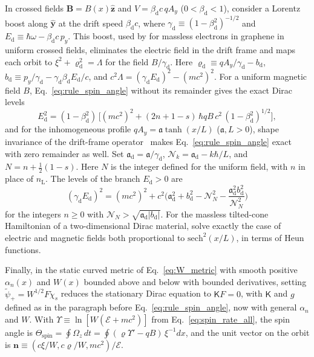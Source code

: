 \documentclass[aps,prd,onecolumn,tightenlines,nofootinbib,notitlepage,11pt,floatfix]{revtex4-2}
\theoremstyle{indentedtheorem}
\begin{document}
In crossed fields $\mathbf{B}=B(x)\hat{\mathbf{z}}$ and $V=\beta_\text{d}c\,qA_y$ ($0<\beta_\text{d}<1$), consider a Lorentz boost along $\hat{\mathbf{y}}$ at the drift speed $\beta_\text{d}c$, where $\gamma_\text{d} \equiv (1-\beta_\text{d}^2)^{-1/2}$ and $E_\text{d} \equiv \hbar\omega - \beta_\text{d}c\,p_y$. This boost, used by \citet{Lukose2007Novel} for massless electrons in graphene in uniform crossed fields, eliminates the electric field in the drift frame and maps each orbit to $\xi^2+\varrho_\text{d}^2=\Lambda$ for the field $B/\gamma_\text{d}$. Here $\varrho_\text{d} \equiv qA_y/\gamma_\text{d}-b_\text{d}$, $b_\text{d} \equiv p_y/\gamma_\text{d} - \gamma_\text{d}\beta_\text{d}E_\text{d}/c$, and $c^2\Lambda = (\gamma_\text{d}E_\text{d})^2 - (mc^2)^2$. For a uniform magnetic field $B$, Eq.~\eqref{eq:rule_spin_angle} without its remainder gives the exact Dirac levels
\begin{equation}
    E_\text{d}^2 = (1-\beta_\text{d}^2)\,\big[(mc^2)^2+(2n+1-s)\,\hbar qB\,c^2\,(1-\beta_\text{d}^2)^{1/2}\big] ,
    \label{eq:crossed_exact}
\end{equation}
and for the inhomogeneous profile $qA_y = \mathfrak{a}\tanh(x/L)$ ($\mathfrak{a},L>0$), shape invariance of the drift-frame operator~\citep{CooperKhareSukhatme1995Supersymmetry} makes Eq.~\eqref{eq:rule_spin_angle} exact with zero remainder as well. Set $\mathfrak{a}_\text{d}=\mathfrak{a}/\gamma_\text{d}$, $\mathcal{N}_k = \mathfrak{a}_\text{d}-k\hbar/L$, and $N = n+\tfrac{1}{2}(1-s)$. Here $N$ is the integer defined for the uniform field, with $n$ in place of $n_\text{L}$. The levels of the branch $E_\text{d}>0$ are
\begin{equation}
    (\gamma_\text{d}E_\text{d})^2 = (mc^2)^2+c^2\Big(\mathfrak{a}_\text{d}^2+b_\text{d}^2-\mathcal{N}_N^2-\frac{\mathfrak{a}_\text{d}^2b_\text{d}^2}{\mathcal{N}_N^2}\Big)
    \label{eq:crossed_tanh}
\end{equation}
for the integers $n\geq0$ with $\mathcal{N}_N>\sqrt{\mathfrak{a}_\text{d}|b_\text{d}|}$. For the massless tilted-cone Hamiltonian of a two-dimensional Dirac material, \citet{OCampa2025Spectral} solve exactly the case of electric and magnetic fields both proportional to $\mathrm{sech}^2(x/L)$, in terms of Heun functions.

Finally, in the static curved metric of Eq.~\eqref{eq:W_metric} with smooth positive $\alpha_n(x)$ and $W(x)$ bounded above and below with bounded derivatives, setting $\tilde{\psi}_+=W^{1/2}F\check{\chi}_s$ reduces the stationary Dirac equation to $\mathsf{K}F=0$, with $\mathsf{K}$ and $g$ defined as in the paragraph before Eq.~\eqref{eq:rule_spin_angle}, now with general $\alpha_n$ and $W$. With $\Upsilon \equiv \ln[W(\mathcal{E}+mc^2)]$ from Eq.~\eqref{eq:spin_rate_all}, the spin angle is $\Theta_\text{spin} = \oint\Omega_z\,dt = \oint(\varrho\Upsilon'-qB)\,\xi^{-1}dx$, and the unit vector on the orbit is $\mathbf{n} \equiv (c\xi/W,c\varrho/W,mc^2)/\mathcal{E}$.
\end{document}
